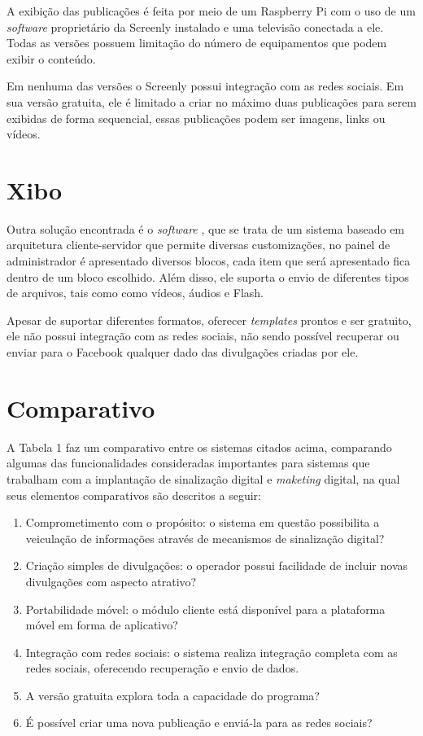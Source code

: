 A exibição das publicações é feita por meio de um Raspberry Pi com o uso de um \textit{software} proprietário da Screenly instalado e uma televisão conectada a ele. Todas as versões possuem limitação do número de equipamentos que podem exibir o conteúdo.

Em nenhuma das versões o Screenly possui integração com as redes sociais. Em sua versão gratuita, ele é limitado a criar no máximo duas publicações para serem exibidas de forma sequencial, essas publicações podem ser imagens, links ou vídeos.

\section{Xibo}
Outra solução encontrada é o \textit{software} \citet{xibo2017}, que se trata de um sistema baseado em arquitetura cliente-servidor que permite diversas customizações, no painel de administrador é apresentado diversos blocos, cada item que será apresentado fica dentro de um bloco escolhido. Além disso, ele suporta o envio de diferentes tipos de arquivos, tais como como vídeos, áudios e Flash.

Apesar de suportar diferentes formatos, oferecer \textit{templates} prontos e ser gratuito, ele não possui integração com as redes sociais, não sendo possível recuperar ou enviar para o Facebook qualquer dado das divulgações criadas por ele. 

\section{Comparativo}
A Tabela 1 faz um comparativo entre os sistemas citados acima, comparando algumas das funcionalidades consideradas importantes para sistemas que trabalham com a implantação de sinalização digital e \textit{maketing} digital, na qual seus elementos comparativos são descritos a seguir:
\begin{enumerate}[label=\Roman*)]
	\item Comprometimento com o propósito: o sistema em questão possibilita a veiculação de informações através de mecanismos de sinalização digital?
	\item Criação simples de divulgações: o operador possui facilidade de incluir novas divulgações com aspecto atrativo?
	\item Portabilidade móvel: o módulo cliente está disponível para a plataforma móvel em forma de aplicativo?
	\item Integração com redes sociais: o sistema realiza integração completa com as redes sociais, oferecendo recuperação e envio de dados.
	\item A versão gratuita explora toda a capacidade do programa?
	\item É possível criar uma nova publicação e enviá-la para as redes sociais?
\end{enumerate}


